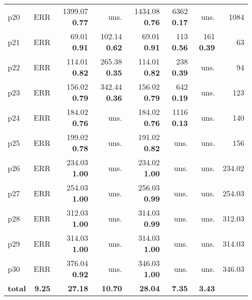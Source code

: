 \begin{tabular}{lrrrrrrr}
\multicolumn{1}{l|}{p20} & ERR & {\footnotesize 1399.07} \textbf{0.77} & uns. & {\footnotesize 1434.08} \textbf{0.76} & {\footnotesize 6362} \textbf{0.17} & uns. & \multicolumn{1}{|r}{1084}\\
\multicolumn{1}{l|}{p21} & ERR & {\footnotesize 69.01} \textbf{0.91} & {\footnotesize 102.14} \textbf{0.62} & {\footnotesize 69.01} \textbf{0.91} & {\footnotesize 113} \textbf{0.56} & {\footnotesize 161} \textbf{0.39} & \multicolumn{1}{|r}{63}\\
\multicolumn{1}{l|}{p22} & ERR & {\footnotesize 114.01} \textbf{0.82} & {\footnotesize 265.38} \textbf{0.35} & {\footnotesize 114.01} \textbf{0.82} & {\footnotesize 238} \textbf{0.39} & uns. & \multicolumn{1}{|r}{94}\\
\multicolumn{1}{l|}{p23} & ERR & {\footnotesize 156.02} \textbf{0.79} & {\footnotesize 342.44} \textbf{0.36} & {\footnotesize 156.02} \textbf{0.79} & {\footnotesize 642} \textbf{0.19} & uns. & \multicolumn{1}{|r}{123}\\
\multicolumn{1}{l|}{p24} & ERR & {\footnotesize 184.02} \textbf{0.76} & uns. & {\footnotesize 184.02} \textbf{0.76} & {\footnotesize 1116} \textbf{0.13} & uns. & \multicolumn{1}{|r}{140}\\
\multicolumn{1}{l|}{p25} & ERR & {\footnotesize 199.02} \textbf{0.78} & uns. & {\footnotesize 191.02} \textbf{0.82} & uns. & uns. & \multicolumn{1}{|r}{156}\\
\multicolumn{1}{l|}{p26} & ERR & {\footnotesize 234.03} \textbf{1.00} & uns. & {\footnotesize 234.02} \textbf{1.00} & uns. & uns. & \multicolumn{1}{|r}{234.02}\\
\multicolumn{1}{l|}{p27} & ERR & {\footnotesize 254.03} \textbf{1.00} & uns. & {\footnotesize 256.03} \textbf{0.99} & uns. & uns. & \multicolumn{1}{|r}{254.03}\\
\multicolumn{1}{l|}{p28} & ERR & {\footnotesize 312.03} \textbf{1.00} & uns. & {\footnotesize 314.03} \textbf{0.99} & uns. & uns. & \multicolumn{1}{|r}{312.03}\\
\multicolumn{1}{l|}{p29} & ERR & {\footnotesize 314.03} \textbf{1.00} & uns. & {\footnotesize 314.03} \textbf{1.00} & uns. & uns. & \multicolumn{1}{|r}{314.03}\\
\multicolumn{1}{l|}{p30} & ERR & {\footnotesize 376.04} \textbf{0.92} & uns. & {\footnotesize 346.03} \textbf{1.00} & uns. & uns. & \multicolumn{1}{|r}{346.03}\\
\midrule
\textbf{total} & \textbf{9.25} & \textbf{27.18} & \textbf{10.70} & \textbf{28.04} & \textbf{7.35} & \textbf{3.43} & \\
\bottomrule
\end{tabular}

